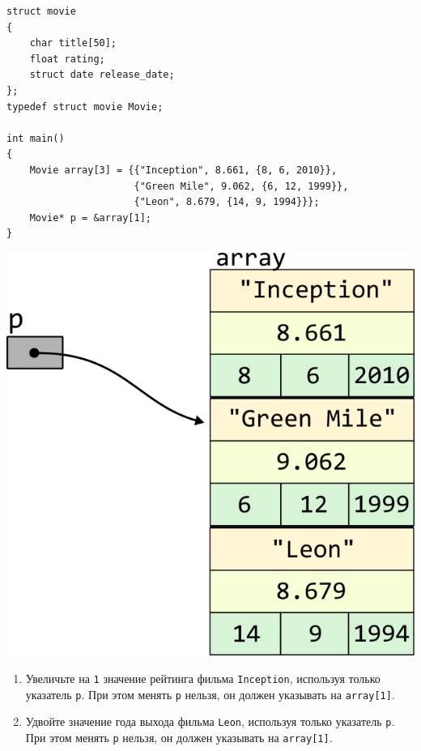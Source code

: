 \documentclass{article}
\begin{document}
\begin{enumerate}
\begin{lstlisting}
struct movie 
{
    char title[50];
    float rating;
    struct date release_date;
};
typedef struct movie Movie;

int main() 
{
    Movie array[3] = {{"Inception", 8.661, {8, 6, 2010}}, 
                      {"Green Mile", 9.062, {6, 12, 1999}}, 
                      {"Leon", 8.679, {14, 9, 1994}}};
    Movie* p = &array[1];
}
\end{lstlisting}

\vspace{-59ex}
\begin{center}
\quad\quad\quad\quad\quad\quad\quad\quad\quad\quad\quad\quad\quad\quad\quad\quad\quad\quad\quad\quad\quad\quad\quad
\includegraphics[scale=1]{../images/pointer_schemes/pointer_to_array_of_struct_movie.png}
\end{center}

\begin{enumerate}
\item Увеличьте на \texttt{1} значение рейтинга фильма \texttt{Inception}, используя только указатель \texttt{p}. При этом менять \texttt{p} нельзя, он  должен указывать на \texttt{array[1]}.
\item Удвойте значение года выхода фильма \texttt{Leon}, используя только указатель \texttt{p}. При этом менять \texttt{p} нельзя, он  должен указывать на \texttt{array[1]}.
\end{enumerate}

\end{enumerate}
\end{document}
